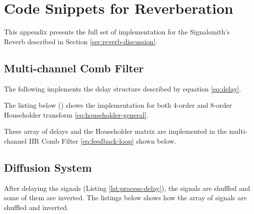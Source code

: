 \section{Code Snippets for Reverberation}
\label{app:reverb_code}

This appendix presents the full set of implementation for the Signalsmith's Reverb
described in Section \ref{sec:reverb-discussion}.

\subsection{Multi-channel Comb Filter}

The following implements the delay structure described by equation \eqref{eq:delay}.



The listing below () \cite{openai_chatgpt} shows the implementation for both 4-order and 8-order Householder 
transform \eqref{eq:householder-general}.



These array of delays and the Householder matrix are implemented in the multi-channel IIR Comb Filter \eqref{eq:feedback-loop} shown below.




\subsection{Diffusion System}

After delaying the signals (Listing \ref{lst:process-delay}), the signals are shuffled and some of them are inverted.
The listings below shows how the array of signals are shuffled and inverted.



